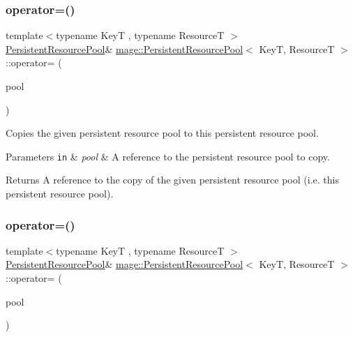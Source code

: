 \subsubsection{\texorpdfstring{operator=()}{operator=()}\hspace{0.1cm}{\footnotesize\ttfamily [1/2]}}
{\footnotesize\ttfamily template$<$typename KeyT , typename ResourceT $>$ \\
\mbox{\hyperlink{classmage_1_1_persistent_resource_pool}{Persistent\+Resource\+Pool}}\& \mbox{\hyperlink{classmage_1_1_persistent_resource_pool}{mage\+::\+Persistent\+Resource\+Pool}}$<$ KeyT, ResourceT $>$\+::operator= (\begin{DoxyParamCaption}\item[{const \mbox{\hyperlink{classmage_1_1_persistent_resource_pool}{Persistent\+Resource\+Pool}}$<$ KeyT, ResourceT $>$ \&}]{pool }\end{DoxyParamCaption})\hspace{0.3cm}{\ttfamily [delete]}}

Copies the given persistent resource pool to this persistent resource pool.


\begin{DoxyParams}[1]{Parameters}
\mbox{\tt in}  & {\em pool} & A reference to the persistent resource pool to copy. \\
\hline
\end{DoxyParams}
\begin{DoxyReturn}{Returns}
A reference to the copy of the given persistent resource pool (i.\+e. this persistent resource pool). 
\end{DoxyReturn}
\mbox{\label{classmage_1_1_persistent_resource_pool_adcec8a286b15174ee99200b68ba0589e}} 
\subsubsection{\texorpdfstring{operator=()}{operator=()}\hspace{0.1cm}{\footnotesize\ttfamily [2/2]}}
{\footnotesize\ttfamily template$<$typename KeyT , typename ResourceT $>$ \\
\mbox{\hyperlink{classmage_1_1_persistent_resource_pool}{Persistent\+Resource\+Pool}}\& \mbox{\hyperlink{classmage_1_1_persistent_resource_pool}{mage\+::\+Persistent\+Resource\+Pool}}$<$ KeyT, ResourceT $>$\+::operator= (\begin{DoxyParamCaption}\item[{\mbox{\hyperlink{classmage_1_1_persistent_resource_pool}{Persistent\+Resource\+Pool}}$<$ KeyT, ResourceT $>$ \&\&}]{pool }\end{DoxyParamCaption})\hspace{0.3cm}{\ttfamily [delete]}}

